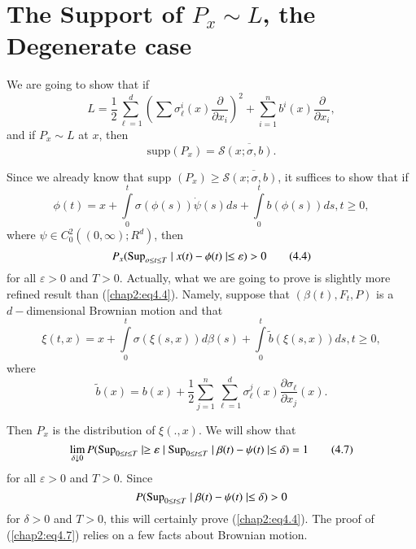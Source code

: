 \section{The Support of $P_x \sim L$, the Degenerate case}
We are going to show  that if 
\begin{equation*}
L = \frac{1}{2} \sum^{d}_{\ell = 1}  ( \sum \sigma^i_\ell (x)
\frac{\partial}{\partial x_i} )^2 + \sum^{n}_{i = 1} b^i  (x)
\frac{\partial}{\partial x_i}, \tag{4.1}\label{chap2:eq4.1}  
\end{equation*}
and if  $ P_x \sim L $ at $x$, then
\begin{equation*}
\text{supp} ( P_x ) = \mathscr{S} \overline{ ( x;
  \sigma,b)}. \tag{4.2}\label{chap2:eq4.2} 
\end{equation*}

Since we already know that  supp $ ( P_x )\ge \mathscr{S} \overline{(
  x; \sigma, b)} $, it suffices to show that if 
\begin{equation*}
 \phi (t)  = x + \int \limits^{t}_{0} \sigma ( \phi (s)) \dot{\psi}
 (s) ds + \int \limits^{t}_{0}  b ( \phi (s)) ds, t \ge 0,
 \tag{4.3}\label{chap2:eq4.3}  
\end{equation*}
where $ \psi \in  C^2_0 ((0,\infty); R^d )$, then 
\begin{equation*}
P_x( \operatorname{Sup}_{o \leq t \leq T}   \mid x (t) - \phi (t)  \mid  \leq
\varepsilon ) > 0 \tag{4.4}\label{chap2:eq4.4}  
\end{equation*}
for all $ \varepsilon > 0 $ and  $ T > 0 $. Actually, what we are
going to prove  is slightly more refined result than
(\ref{chap2:eq4.4}). Namely, 
suppose that  $ ( \beta ( t), F_t, P ) $ is a 
$d-$dimensional Brownian motion and  that   
\begin{equation*}
\xi (t,x) = x + \int \limits^{t}_{0}  \sigma ( \xi (s,x )) d \beta
(s)  + \int \limits^{t}_{0} \tilde{b} ( \xi (s,x )) ds, t \ge  0,
\tag{4.5}\label{chap2:eq4.5} 
\end{equation*}
where 
\begin{equation*}
\tilde{b} (x)  =  b (x) + \frac{1}{2} \sum^{n}_{j =1} 
\sum^{d}_{\ell=1} \sigma^j_\ell (x)  \frac{\partial
  \sigma_\ell}{\partial x_j} (x) . \tag{4.6}\label{chap2:eq4.6} 
\end{equation*}\pageoriginale

Then $ P_x $  is the distribution of $ \xi (., x ) $. We will show
that  
\begin{equation*}
\lim_{\delta \downarrow 0} P ( \operatorname{Sup}_{ 0 \leq t \leq T}  \mid  \ge
\varepsilon \mid  \operatorname{Sup}_{ 0 \leq t \leq T} \mid \beta (t) - \psi (t)
\mid  \leq \delta ) = 1 \tag{4.7}\label{chap2:eq4.7}  
\end{equation*}
for all $ \varepsilon > 0 $ and  $ T > 0 $. Since 
$$ 
P( \operatorname{Sup}_{ 0 \leq t \leq T}  \mid \beta (t) - \psi (t) \mid  \leq
\delta ) >  0 
$$
for  $ \delta > 0 $  and $ T> 0 $, this will certainly prove
(\ref{chap2:eq4.4}). The  proof of (\ref{chap2:eq4.7}) relies on a few
facts about Brownian  motion.  

